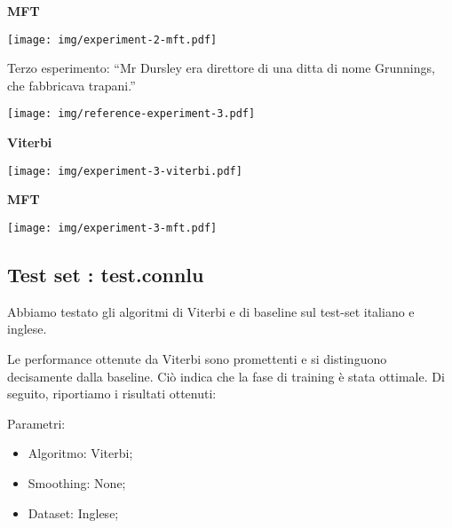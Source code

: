 \newpage
\centerline{\textbf{MFT}}
\begin{outline}
    \begin{center}
     \texttt{[image: img/experiment-2-mft.pdf]}
    \end{center}
\end{outline}
Terzo esperimento: ``Mr Dursley era direttore di una ditta di nome Grunnings, che fabbricava trapani.''
\begin{outline}
    \begin{center}
     \texttt{[image: img/reference-experiment-3.pdf]}
    \end{center}
\end{outline}
\newline
\newline
\centerline{\textbf{Viterbi}}
\begin{outline}
    \begin{center}
     \texttt{[image: img/experiment-3-viterbi.pdf]}
    \end{center}
\end{outline}
\centerline{\textbf{MFT}}
\begin{outline}
    \begin{center}
     \texttt{[image: img/experiment-3-mft.pdf]}
    \end{center}
\end{outline}

\subsection{Test set : test.connlu}
Abbiamo testato gli algoritmi di Viterbi e di baseline sul test-set italiano e inglese.

Le performance ottenute da Viterbi sono promettenti e si distinguono decisamente dalla baseline. Ciò indica che la fase di training è stata ottimale. Di seguito, riportiamo i risultati ottenuti:
\newpage

\noindent Parametri:
\begin{itemize}
 \item Algoritmo: Viterbi;
 \item Smoothing: None;
 \item Dataset: Inglese;
\end{itemize}


